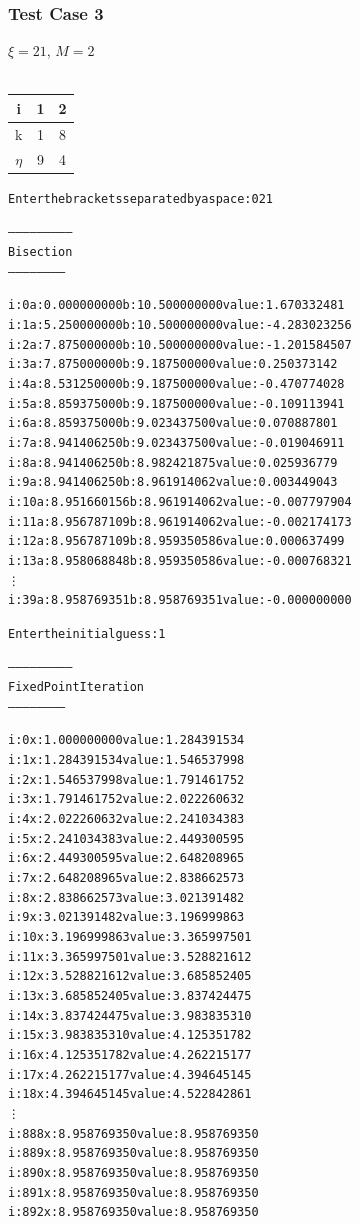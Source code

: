 \documentclass[11pt]{article} %
\begin{document}
\subsubsection*{Test Case 3}
$\xi = 21$, $M = 2$ \\ \\
\begin{tabular}{||c||c c |}
\hline
i & 1 & 2  \\
\hline
k & 1 & 8 \\
\hline
$\eta$ & 9 & 4 \\
\hline
\end{tabular}


\begin{alltt}
Enter the brackets separated by a space: 0 21

--------------------------
 Bisection
 -----------------------


i: 0	a: 0.000000000	b: 10.500000000	value: 1.670332481 
i: 1	a: 5.250000000	b: 10.500000000	value: -4.283023256 
i: 2	a: 7.875000000	b: 10.500000000	value: -1.201584507 
i: 3	a: 7.875000000	b: 9.187500000	value: 0.250373142 
i: 4	a: 8.531250000	b: 9.187500000	value: -0.470774028 
i: 5	a: 8.859375000	b: 9.187500000	value: -0.109113941 
i: 6	a: 8.859375000	b: 9.023437500	value: 0.070887801 
i: 7	a: 8.941406250	b: 9.023437500	value: -0.019046911 
i: 8	a: 8.941406250	b: 8.982421875	value: 0.025936779 
i: 9	a: 8.941406250	b: 8.961914062	value: 0.003449043 
i: 10	a: 8.951660156	b: 8.961914062	value: -0.007797904 
i: 11	a: 8.956787109	b: 8.961914062	value: -0.002174173 
i: 12	a: 8.956787109	b: 8.959350586	value: 0.000637499 
i: 13	a: 8.958068848	b: 8.959350586	value: -0.000768321 
\vdots
i: 39	a: 8.958769351	b: 8.958769351	value: -0.000000000 

Enter the initial guess: 1

--------------------------
 Fixed Point Iteration
 -----------------------


i: 0	x: 1.000000000	value: 1.284391534
i: 1	x: 1.284391534	value: 1.546537998
i: 2	x: 1.546537998	value: 1.791461752
i: 3	x: 1.791461752	value: 2.022260632
i: 4	x: 2.022260632	value: 2.241034383
i: 5	x: 2.241034383	value: 2.449300595
i: 6	x: 2.449300595	value: 2.648208965
i: 7	x: 2.648208965	value: 2.838662573
i: 8	x: 2.838662573	value: 3.021391482
i: 9	x: 3.021391482	value: 3.196999863
i: 10	x: 3.196999863	value: 3.365997501
i: 11	x: 3.365997501	value: 3.528821612
i: 12	x: 3.528821612	value: 3.685852405
i: 13	x: 3.685852405	value: 3.837424475
i: 14	x: 3.837424475	value: 3.983835310
i: 15	x: 3.983835310	value: 4.125351782
i: 16	x: 4.125351782	value: 4.262215177
i: 17	x: 4.262215177	value: 4.394645145
i: 18	x: 4.394645145	value: 4.522842861
\vdots
i: 888	x: 8.958769350	value: 8.958769350
i: 889	x: 8.958769350	value: 8.958769350
i: 890	x: 8.958769350	value: 8.958769350
i: 891	x: 8.958769350	value: 8.958769350
i: 892	x: 8.958769350	value: 8.958769350


\end{alltt}
\end{document}
